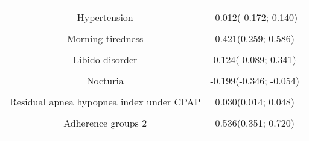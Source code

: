 \documentclass{article}
\begin{document}
\begin{longtable}[t]{cc}
\cellcolor{gray!6}{Gender (male)} & \cellcolor{gray!6}{0.268(0.091; 0.435)}\\
Hypertension & -0.012(-0.172; 0.140)\\
\cellcolor{gray!6}{Restless legs syndrome} & \cellcolor{gray!6}{0.145(-0.045; 0.330)}\\
Morning tiredness & 0.421(0.259; 0.586)\\
\cellcolor{gray!6}{Morning headaches} & \cellcolor{gray!6}{-0.010(-0.227; 0.208)}\\
Libido disorder & 0.124(-0.089; 0.341)\\
\cellcolor{gray!6}{Night sweating} & \cellcolor{gray!6}{0.283(0.080; 0.478)}\\
Nocturia & -0.199(-0.346; -0.054)\\
\cellcolor{gray!6}{Pichot's fatigue scale} & \cellcolor{gray!6}{0.336(0.321; 0.351)}\\
Residual apnea  hypopnea index under CPAP & 0.030(0.014; 0.048)\\
\cellcolor{gray!6}{Adherence groups 1} & \cellcolor{gray!6}{1.054(0.848; 1.265)}\\
Adherence groups 2 & 0.536(0.351; 0.720)\\
\cellcolor{gray!6}{Adherence groups 3} & \cellcolor{gray!6}{0.291(0.087; 0.500)}\\*
\end{longtable}
\endgroup{}
\clearpage


      
\end{document}
